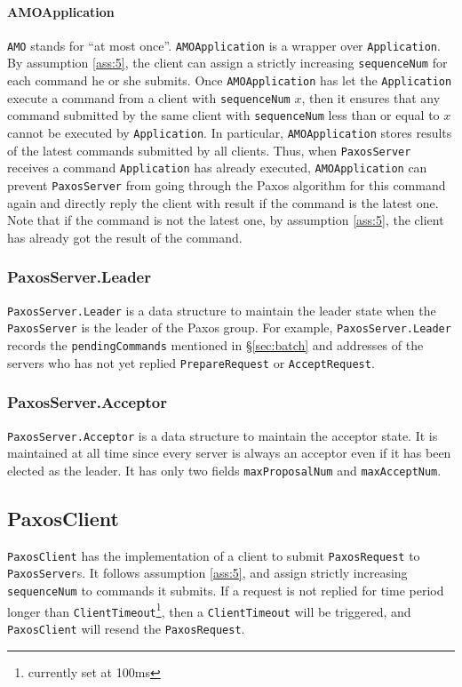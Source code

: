 \documentclass{article}
\numberwithin{equation}{section}
\begin{document}
\paragraph{AMOApplication}\verb|AMO| stands for ``at most once''. \verb|AMOApplication| is a wrapper over \verb|Application|. By assumption \ref{ass:5}, the client can assign a strictly increasing \verb|sequenceNum| for each command he or she submits. Once \verb|AMOApplication| has let the \verb|Application| execute a command from a client with \verb|sequenceNum| $x$, then it ensures that any command submitted by the same client with \verb|sequenceNum| less than or equal to $x$ cannot be executed by \verb|Application|. In particular, \verb|AMOApplication| stores results of the latest commands submitted by all clients. Thus, when \verb|PaxosServer| receives a command \verb|Application| has already executed, \verb|AMOApplication| can prevent \verb|PaxosServer| from going through the Paxos algorithm for this command again and directly reply the client with result if the command is the latest one. Note that if the command is not the latest one, by assumption \ref{ass:5}, the client has already got the result of the command.

\subsubsection{PaxosServer.Leader}
\verb|PaxosServer.Leader| is a data structure to maintain the leader state when the \verb|PaxosServer| is the leader of the Paxos group. For example, \verb|PaxosServer.Leader| records the \verb|pendingCommands| mentioned in \S\ref{sec:batch} and addresses of the servers who has not yet replied \verb|PrepareRequest| or \verb|AcceptRequest|.

\subsubsection{PaxosServer.Acceptor}
\verb|PaxosServer.Acceptor| is a data structure to maintain the acceptor state. It is maintained at all time since every server is always an acceptor even if it has been elected as the leader. It has only two fields \verb|maxProposalNum| and \verb|maxAcceptNum|.

\subsection{PaxosClient}
\verb|PaxosClient| has the implementation of a client to submit \verb|PaxosRequest| to \verb|PaxosServer|s. It follows assumption \ref{ass:5}, and assign strictly increasing \verb|sequenceNum| to commands it submits. If a request is not replied for time period longer than \verb|ClientTimeout|\footnote{currently set at 100ms}, then a \verb|ClientTimeout| will be triggered, and \verb|PaxosClient| will resend the \verb|PaxosRequest|.
\end{document}
